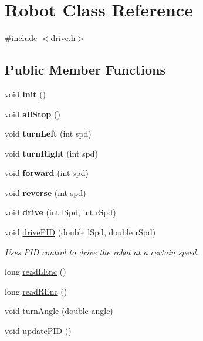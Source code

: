 \hypertarget{classRobot}{}\section{Robot Class Reference}
\label{classRobot}


{\ttfamily \#include $<$drive.\+h$>$}

\subsection*{Public Member Functions}
\begin{DoxyCompactItemize}
\item 
\mbox{\label{classRobot_a990e86a39cb249629a0985e71211fa2e}} 
void {\bfseries init} ()
\item 
\mbox{\label{classRobot_a5b1079b77286f963c509b5faa6eb086e}} 
void {\bfseries all\+Stop} ()
\item 
\mbox{\label{classRobot_ae98f6f49a4cbe9a2d3741d22483dea65}} 
void {\bfseries turn\+Left} (int spd)
\item 
\mbox{\label{classRobot_ab9641c762bcded8d42b44d54b4a88796}} 
void {\bfseries turn\+Right} (int spd)
\item 
\mbox{\label{classRobot_a592f08d965facad4153cc6dafc0dc2c5}} 
void {\bfseries forward} (int spd)
\item 
\mbox{\label{classRobot_a620dfa100c49bdcc9adea47f74c88a43}} 
void {\bfseries reverse} (int spd)
\item 
\mbox{\label{classRobot_a872c305b49b0733696a5348e2c8e41c7}} 
void {\bfseries drive} (int l\+Spd, int r\+Spd)
\item 
void \hyperlink{classRobot_a88211ed70c106b8b0c1c0edec49c87a4}{drive\+P\+ID} (double l\+Spd, double r\+Spd)
\begin{DoxyCompactList}\small\item\em Uses P\+ID control to drive the robot at a certain speed. \end{DoxyCompactList}\item 
long \hyperlink{classRobot_ab85e483abd6bb9eb1a3822b44f66aa35}{read\+L\+Enc} ()
\item 
long \hyperlink{classRobot_a2bc5b4f70b378e51c9bef971d24c3465}{read\+R\+Enc} ()
\item 
void \hyperlink{classRobot_a16a8fc6dbaa682231fc5f02754d3d686}{turn\+Angle} (double angle)
\item 
void \hyperlink{classRobot_a7f156346f70997f29e326d0d96acc4d0}{update\+P\+ID} ()
\end{DoxyCompactItemize}


